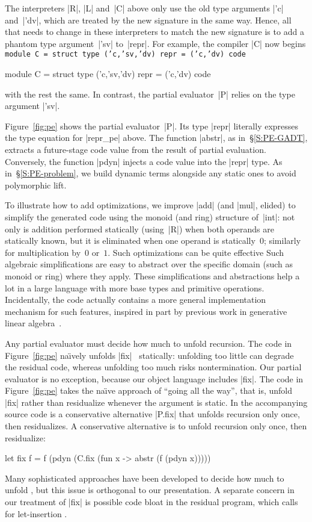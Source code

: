 The interpreters |R|, |L| and~|C| above only use the old
type arguments |'c| and~|'dv|, which are treated by the new signature
in the same way.  Hence, all that needs to change in these interpreters
to match the new signature is to add a phantom type
argument~|'sv| to~|repr|.
For example, the compiler |C| now begins
\ifshort
\texttt{module C = struct
  type ('c,'sv,'dv) repr = ('c,'dv) code}
\else
\begin{code}
module C = struct
  type ('c,'sv,'dv) repr = ('c,'dv) code
\end{code}
\fi
with the rest the same.
In contrast, the partial evaluator~|P| relies on the type argument |'sv|.


Figure~\ref{fig:pe} shows the partial evaluator~|P|.
Its type |repr| literally expresses the type equation for |repr_pe| above.
The function |abstr|, as in~\S\ref{S:PE-GADT},
extracts a future-stage code value from the result of
partial evaluation.  Conversely, the function |pdyn| injects a
code value into the |repr| type. As
in~\S\ref{S:PE-problem}, we build dynamic terms alongside
any static ones to avoid polymorphic lift.

To illustrate how to add optimizations, we improve |add| (and |mul|,
elided) to simplify the generated code using the monoid (and ring)
structure of~|int|: not only is addition performed statically
(using~|R|) when both operands are statically known, but it is
eliminated when one operand is statically~$0$; similarly for
multiplication by~$0$ or~$1$.  
\ifshort
Such optimizations can be quite effective
\else
Such algebraic simplifications are easy
to abstract over the specific domain (such as monoid or ring) where they
apply.  These simplifications and abstractions help a lot
\fi
in a large language with more base types and primitive operations.
\ifshort\else
Incidentally, the code actually contains a more general implementation
mechanism for such features, inspired in part by previous work in
generative linear algebra~\cite{CaretteKiselyov05}.
\fi

Any partial evaluator must decide how much to unfold recursion\ifshort.
The code in Figure~\ref{fig:pe} na\"\i vely unfolds |fix|
\else\
statically: unfolding too little can degrade the residual code, whereas
unfolding too much risks nontermination.  Our partial evaluator is no
exception, because our object language includes |fix|.  The code in
Figure~\ref{fig:pe} takes the na\"\i ve approach of ``going all the
way'', that is, unfold |fix| rather than residualize
\fi
whenever the
argument is static.
\ifshort
In the accompanying source code is a conservative
alternative |P.fix| that unfolds recursion only once, then residualizes.
\else
A conservative alternative is to unfold recursion only once, then residualize:
\begin{code}
let fix f = f (pdyn (C.fix (fun x -> abstr (f (pdyn x)))))
\end{code}
\fi
Many sophisticated approaches have been developed to decide how much to unfold
\cite{jones-partial}, but this issue is orthogonal to our presentation.
\ifshort\else
A separate concern in our treatment of |fix| is possible code bloat in
the residual program, which calls for let-insertion
\cite{SwadiTahaKiselyovPasalic2006}.
\fi


